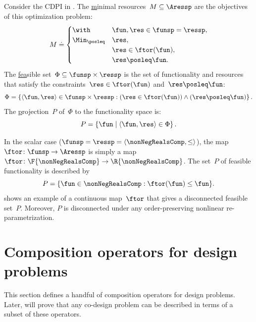 \medskip{}

\begin{example}
\label{exa:one}Consider the CDPI in . The \uline{m}inimal
resources~$M\subseteq\Aressp$ are the objectives of this optimization
problem:
\[
M\doteq\begin{cases}
\with & \fun,\res\in\funsp=\ressp,\\
\Min_{\posleq} & \res,\\
 & \res\in\ftor(\fun),\\
 & \res\posleq\fun.
\end{cases}
\]
The \uline{fea}sible set~$\Phi\subseteq\funsp\times\ressp$ is
the set of functionality and resources that satisfy the constraints~$\res\in\ftor(\fun)$
and~$\res\posleq\fun$:
\begin{equation}
\Phi=\left\{ \langle\fun,\res\rangle\in\funsp\times\ressp:(\res\in\ftor(\fun))\wedge(\res\posleq\fun)\right\} .\label{eq:feasible}
\end{equation}
The \uline{p}rojection~$P$ of~$\Phi$ to the functionality space
is:
\[
P=\left\{ \fun\mid\left\langle \fun,\res\right\rangle \in\Phi\right\} .
\]

In the scalar case ($\funsp=\ressp=\langle\nonNegRealsComp,\leq\rangle$),
the map~$\ftor\colon\funsp\rightarrow\Aressp$ is simply a map~$\ftor\colon\F{\nonNegRealsComp}\rightarrow\R{\nonNegRealsComp}$.
The set~$P$ of feasible functionality is described by
\begin{equation}
P=\{\fun\in\nonNegRealsComp:\ftor(\fun)\leq\fun\}.\label{eq:Pfeasible}
\end{equation}
 shows an example of a continuous map~$\ftor$
that gives a disconnected feasible set~$P$. Moreover, $P$ is disconnected
under any order-preserving nonlinear re-parametrization.

\end{example}


\section{Composition operators for design problems}

This section defines a handful of composition operators for design
problems. Later,  will prove that any co-design
problem can be described in terms of a subset of these operators. 

